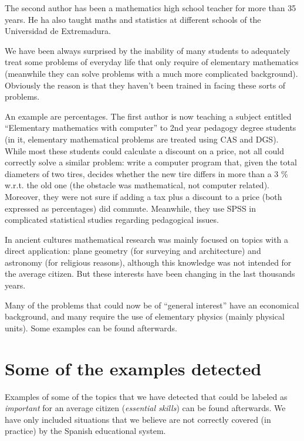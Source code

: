 \documentclass[a4paper]{article} %
\begin{document}
The second author has been a mathematics high school teacher
for more than 35 years. He ha also taught maths and statistics
at different schools of the Universidad de Extremadura.

We have been always surprised by the inability of many students to
adequately treat some problems of everyday life that only require
of elementary mathematics (meanwhile they can solve problems with
a much more complicated background). Obviously the reason is that
they haven't been trained in facing these sorts of problems.

An example are percentages. The first author is now teaching a
subject entitled ``Elementary mathematics with computer'' to 2nd
year pedagogy degree students (in it, elementary mathematical
problems are treated using CAS and DGS). While most these
students could calculate a discount on a price, not all could
correctly solve a similar problem: write a computer program that,
given the total diameters of two tires, decides whether the new
tire differs in more than a 3 \% w.r.t. the old one (the obstacle
was mathematical, not computer related). Moreover,
they were not sure if adding a tax plus a discount to a price
(both expressed as percentages) did commute. Meanwhile, they use
SPSS in complicated statistical studies regarding pedagogical
issues.

In ancient cultures mathematical research was mainly focused on
topics with a direct application: plane geometry (for surveying
and architecture) and astronomy (for religious reasons), although
this knowledge was not intended for the average citizen. But
these interests have been changing in the last thousands years.

Many of the problems that could now be of ``general
interest'' have an economical background, and many require the
use of elementary physics (mainly physical units). Some examples
can be found afterwards.



\section{Some of the examples detected}

Examples of some of the topics that we have detected
that could be labeled as \textit{important} for an average
citizen (\textit{essential skills}) can be found afterwards. We
have only included situations that we believe are not correctly
covered (in practice) by the Spanish educational system.
\end{document}
